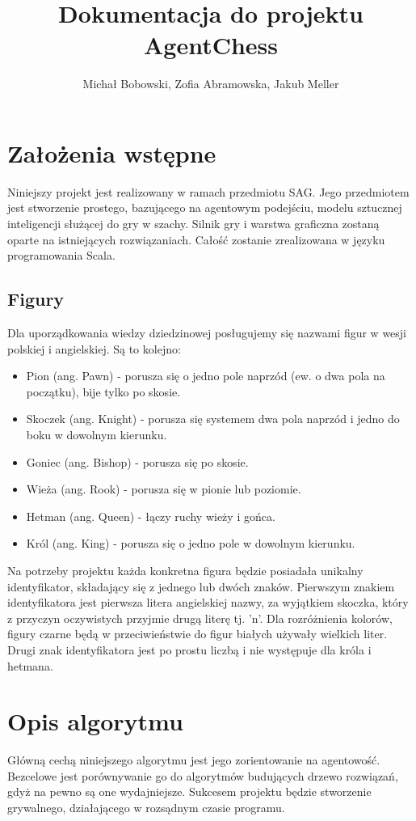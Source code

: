 \documentclass[a4paper,12pt,oneside,notitlepage,onecolumn]{article}
\author{Michał Bobowski, Zofia Abramowska, Jakub Meller}
\title{Dokumentacja do projektu AgentChess}
\begin{document}
  \maketitle
\section{Założenia wstępne}
Niniejszy projekt jest realizowany w ramach przedmiotu SAG.
Jego przedmiotem jest stworzenie prostego, bazującego na agentowym podejściu, modelu sztucznej inteligencji służącej do gry w szachy.
Silnik gry i warstwa graficzna zostaną oparte na istniejących rozwiązaniach.
Całość zostanie zrealizowana w języku programowania Scala.

\subsection{Figury}
Dla uporządkowania wiedzy dziedzinowej posługujemy się nazwami figur w wesji polskiej i angielskiej.
Są to kolejno:
\begin{itemize}
 \item Pion (ang. Pawn) - porusza się o jedno pole naprzód (ew. o dwa pola na początku), bije tylko po skosie.
 \item Skoczek (ang. Knight) - porusza się systemem dwa pola naprzód i jedno do boku w dowolnym kierunku.
 \item Goniec (ang. Bishop) - porusza się po skosie.
 \item Wieża (ang. Rook) - porusza się w pionie lub poziomie.
 \item Hetman (ang. Queen) - łączy ruchy wieży i gońca.
 \item Król (ang. King) - porusza się o jedno pole w dowolnym kierunku.
\end{itemize}

Na potrzeby projektu każda konkretna figura będzie posiadała unikalny identyfikator, składający się z jednego lub dwóch znaków.
Pierwszym znakiem identyfikatora jest pierwsza litera angielskiej nazwy, za wyjątkiem skoczka, który z przyczyn oczywistych przyjmie drugą literę tj. 'n'.
Dla rozróżnienia kolorów, figury czarne będą w przeciwieństwie do figur białych używały wielkich liter.
Drugi znak identyfikatora jest po prostu liczbą i nie występuje dla króla i hetmana.

\section{Opis algorytmu}
Główną cechą niniejszego algorytmu jest jego zorientowanie na agentowość.
Bezcelowe jest porównywanie go do algorytmów budujących drzewo rozwiązań, gdyż na pewno są one wydajniejsze.
Sukcesem projektu będzie stworzenie grywalnego, działającego w rozsądnym czasie programu.
\end{document}
